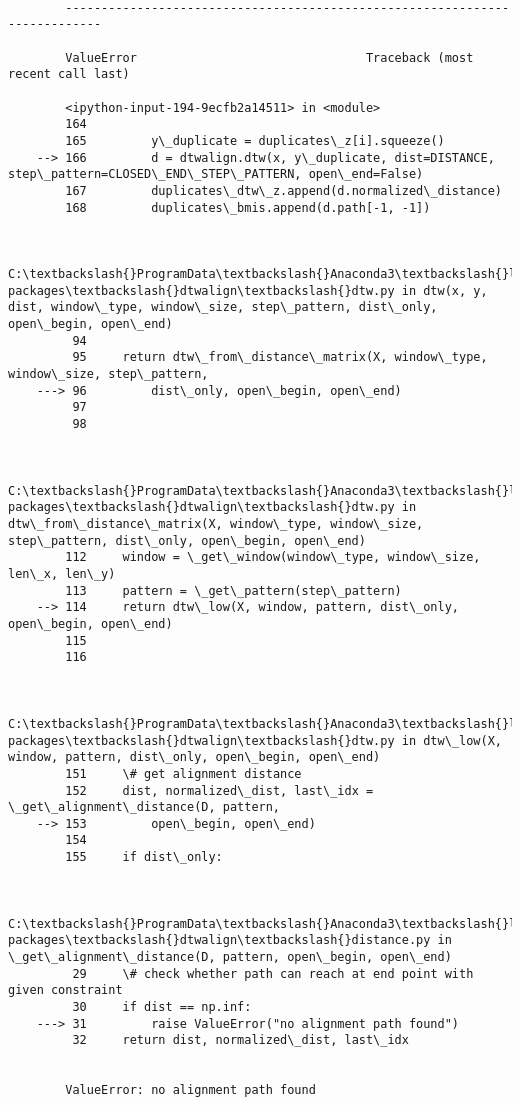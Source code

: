 \documentclass[11pt]{article}
\begin{document}
    \begin{Verbatim}[commandchars=\\\{\}]

        ---------------------------------------------------------------------------

        ValueError                                Traceback (most recent call last)

        <ipython-input-194-9ecfb2a14511> in <module>
        164 
        165         y\_duplicate = duplicates\_z[i].squeeze()
    --> 166         d = dtwalign.dtw(x, y\_duplicate, dist=DISTANCE, step\_pattern=CLOSED\_END\_STEP\_PATTERN, open\_end=False)
        167         duplicates\_dtw\_z.append(d.normalized\_distance)
        168         duplicates\_bmis.append(d.path[-1, -1])
    

        C:\textbackslash{}ProgramData\textbackslash{}Anaconda3\textbackslash{}lib\textbackslash{}site-packages\textbackslash{}dtwalign\textbackslash{}dtw.py in dtw(x, y, dist, window\_type, window\_size, step\_pattern, dist\_only, open\_begin, open\_end)
         94 
         95     return dtw\_from\_distance\_matrix(X, window\_type, window\_size, step\_pattern,
    ---> 96         dist\_only, open\_begin, open\_end)
         97 
         98 
    

        C:\textbackslash{}ProgramData\textbackslash{}Anaconda3\textbackslash{}lib\textbackslash{}site-packages\textbackslash{}dtwalign\textbackslash{}dtw.py in dtw\_from\_distance\_matrix(X, window\_type, window\_size, step\_pattern, dist\_only, open\_begin, open\_end)
        112     window = \_get\_window(window\_type, window\_size, len\_x, len\_y)
        113     pattern = \_get\_pattern(step\_pattern)
    --> 114     return dtw\_low(X, window, pattern, dist\_only, open\_begin, open\_end)
        115 
        116 
    

        C:\textbackslash{}ProgramData\textbackslash{}Anaconda3\textbackslash{}lib\textbackslash{}site-packages\textbackslash{}dtwalign\textbackslash{}dtw.py in dtw\_low(X, window, pattern, dist\_only, open\_begin, open\_end)
        151     \# get alignment distance
        152     dist, normalized\_dist, last\_idx = \_get\_alignment\_distance(D, pattern,
    --> 153         open\_begin, open\_end)
        154 
        155     if dist\_only:
    

        C:\textbackslash{}ProgramData\textbackslash{}Anaconda3\textbackslash{}lib\textbackslash{}site-packages\textbackslash{}dtwalign\textbackslash{}distance.py in \_get\_alignment\_distance(D, pattern, open\_begin, open\_end)
         29     \# check whether path can reach at end point with given constraint
         30     if dist == np.inf:
    ---> 31         raise ValueError("no alignment path found")
         32     return dist, normalized\_dist, last\_idx
    

        ValueError: no alignment path found

    \end{Verbatim}
\end{document}
